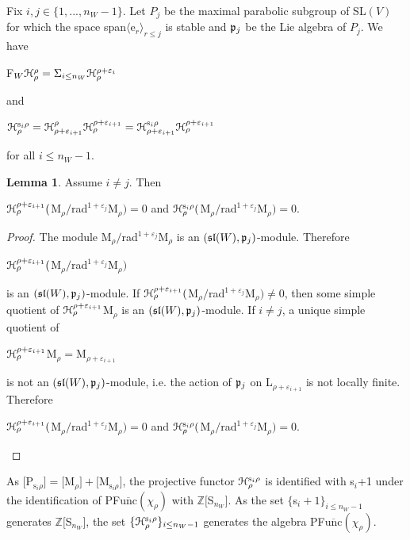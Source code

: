 \documentclass[12pt]{amsart}
\theoremstyle{definition}\newtheorem{theorem}{Theorem}[section]
\newtheorem{lemma}[proposition]{Lemma}
\theoremstyle{definition}\newtheorem{definition}[proposition]{Definition}
\theoremstyle{remark}\newtheorem{example}[proposition]{Example}
\begin{document}
Fix $i, j\in\{1,..., n_W-1\}$. Let $P_j$ be the maximal parabolic subgroup of SL$(V)$ for which the space span$\langle$e$_r\rangle_{r\le j}$ is stable and $\frak p_j$ be the Lie algebra of $P_j$. We have \begin{center}F$_W\EuScript H_\rho^\rho=\Sigma_{i\le n_W}\EuScript H_\rho^{\rho+\varepsilon_i}$\end{center}and\begin{center}$\EuScript H_\rho^{\mathrm s_i\rho}=\EuScript H^\rho_{\rho+\varepsilon_{i+1}}\EuScript H^{\rho+\varepsilon_{i+1}}_\rho=\EuScript H_{\rho+\varepsilon_{i+1}}^{\mathrm s_i\rho}\EuScript H_\rho^{\rho+\varepsilon_{i+1}}$\end{center} for all $i\le n_W-1$.
\begin{lemma} Assume $i\ne j$. Then \begin{center}$\EuScript H_\rho^{\rho+\varepsilon_{i+1}}($M$_\rho/$rad$^{1+\varepsilon_j}$M$_\rho)=0$ and $\EuScript H_\rho^{\mathrm s_i\rho}($M$_\rho/$rad$^{1+\varepsilon_j}$M$_\rho)=0$.\end{center}\end{lemma}
\begin{proof} The module M$_\rho/$rad$^{1+\varepsilon_j}$M$_\rho$ is an $(\frak{sl}(W), \frak p_j)$-module. Therefore \begin{center}$\EuScript H_\rho^{\rho+\varepsilon_{i+1}}($M$_\rho/$rad$^{1+\varepsilon_j}$M$_\rho)$\end{center} is an $(\frak{sl}(W), \frak p_j)$-module. If $\EuScript H_\rho^{\rho+\varepsilon_{i+1}}($M$_\rho/$rad$^{1+\varepsilon_j}$M$_\rho)\ne 0$, then some simple quotient of $\EuScript H_\rho^{\rho+\varepsilon_{i+1}}$M$_\rho$ is an $(\frak{sl}(W), \frak p_j)$-module. If $i\ne j$, a unique simple quotient of \begin{center}$\EuScript H_\rho^{\rho+\varepsilon_{i+1}}$M$_\rho=$M$_{\rho+\varepsilon_{i+1}}$\end{center} is not an $(\frak{sl}(W), \frak p_j)$-module, i.e. the action of $\frak p_j$ on L$_{\rho+\varepsilon_{i+1}}$ is not locally finite. Therefore \begin{center}$\EuScript H_\rho^{\rho+\varepsilon_{i+1}}($M$_\rho/$rad$^{1+\varepsilon_j}$M$_\rho)=0$ and $\EuScript H_\rho^{\mathrm s_i\rho}($M$_\rho/$rad$^{1+\varepsilon_j}$M$_\rho)=0$.\end{center}\end{proof}
As [P$_{\mathrm s_i\rho}] =[$M$_\rho]+[$M$_{\mathrm s_i\rho}]$, the projective functor $\EuScript H_\rho^{\mathrm s_i\rho}$ is identified with s$_i$+1 under the identification of PF$\overline{\mathrm{unc}}(\chi_\rho)$ with $\mathbb Z[$S$_{n_W}]$. As the set $\{$s$_i+1\}_{i\le n_W-1}$ generates $\mathbb Z[$S$_{n_W}]$, the set $\{\EuScript H_\rho^{\mathrm s_i\rho}\}_{i\le n_W-1}$ generates the algebra PF$\overline{\mathrm{unc}}(\chi_\rho)$.
\end{document}

